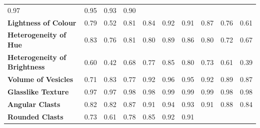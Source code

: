 \begin{longtable}[c]{@{}llllllllll@{}}
  \cellcolor[HTML]{E2EFDA}0.97 &
  \cellcolor[HTML]{FFF2CC}0.95 &
  \cellcolor[HTML]{DDEBF7}0.93 &
  \cellcolor[HTML]{D6DCE4}0.90 \\
\textbf{Lightness of Colour} &
  \cellcolor[HTML]{F8CBAD}0.79 &
  \cellcolor[HTML]{C6E0B4}0.52 &
  \cellcolor[HTML]{FFE699}0.81 &
  \cellcolor[HTML]{B4C6E7}0.84 &
  \cellcolor[HTML]{FCE4D6}0.92 &
  \cellcolor[HTML]{E2EFDA}0.91 &
  \cellcolor[HTML]{FFF2CC}0.87 &
  \cellcolor[HTML]{DDEBF7}0.76 &
  \cellcolor[HTML]{D6DCE4}0.61 \\
\textbf{Heterogeneity of Hue} &
  \cellcolor[HTML]{F8CBAD}0.83 &
  \cellcolor[HTML]{C6E0B4}0.76 &
  \cellcolor[HTML]{FFE699}0.81 &
  \cellcolor[HTML]{B4C6E7}0.80 &
  \cellcolor[HTML]{FCE4D6}0.89 &
  \cellcolor[HTML]{E2EFDA}0.86 &
  \cellcolor[HTML]{FFF2CC}0.80 &
  \cellcolor[HTML]{DDEBF7}0.72 &
  \cellcolor[HTML]{D6DCE4}0.67 \\
\textbf{Heterogeneity of Brightness} &
  \cellcolor[HTML]{F8CBAD}0.60 &
  \cellcolor[HTML]{C6E0B4}0.42 &
  \cellcolor[HTML]{FFE699}0.68 &
  \cellcolor[HTML]{B4C6E7}0.77 &
  \cellcolor[HTML]{FCE4D6}0.85 &
  \cellcolor[HTML]{E2EFDA}0.80 &
  \cellcolor[HTML]{FFF2CC}0.73 &
  \cellcolor[HTML]{DDEBF7}0.61 &
  \cellcolor[HTML]{D6DCE4}0.39 \\
\textbf{Volume of Vesicles} &
  \cellcolor[HTML]{F8CBAD}0.71 &
  \cellcolor[HTML]{C6E0B4}0.83 &
  \cellcolor[HTML]{FFE699}0.77 &
  \cellcolor[HTML]{B4C6E7}0.92 &
  \cellcolor[HTML]{FCE4D6}0.96 &
  \cellcolor[HTML]{E2EFDA}0.95 &
  \cellcolor[HTML]{FFF2CC}0.92 &
  \cellcolor[HTML]{DDEBF7}0.89 &
  \cellcolor[HTML]{D6DCE4}0.87 \\
\textbf{Glasslike Texture} &
  \cellcolor[HTML]{F8CBAD}0.97 &
  \cellcolor[HTML]{C6E0B4}0.97 &
  \cellcolor[HTML]{FFE699}0.98 &
  \cellcolor[HTML]{B4C6E7}0.98 &
  \cellcolor[HTML]{FCE4D6}0.99 &
  \cellcolor[HTML]{E2EFDA}0.99 &
  \cellcolor[HTML]{FFF2CC}0.99 &
  \cellcolor[HTML]{DDEBF7}0.98 &
  \cellcolor[HTML]{D6DCE4}0.98 \\
\textbf{Angular Clasts} &
  \cellcolor[HTML]{F8CBAD}0.82 &
  \cellcolor[HTML]{C6E0B4}0.82 &
  \cellcolor[HTML]{FFE699}0.87 &
  \cellcolor[HTML]{B4C6E7}0.91 &
  \cellcolor[HTML]{FCE4D6}0.94 &
  \cellcolor[HTML]{E2EFDA}0.93 &
  \cellcolor[HTML]{FFF2CC}0.91 &
  \cellcolor[HTML]{DDEBF7}0.88 &
  \cellcolor[HTML]{D6DCE4}0.84 \\
\textbf{Rounded Clasts} &
  \cellcolor[HTML]{F8CBAD}0.73 &
  \cellcolor[HTML]{C6E0B4}0.61 &
  \cellcolor[HTML]{FFE699}0.78 &
  \cellcolor[HTML]{B4C6E7}0.85 &
  \cellcolor[HTML]{FCE4D6}0.92 &
  \cellcolor[HTML]{E2EFDA}0.91 &

\end{longtable}
